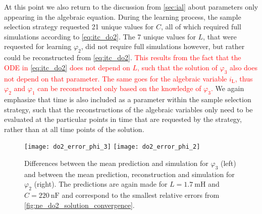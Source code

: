 \documentclass[AMA,STIX1COL]{WileyNJD-v2}
\newcommand{\mr}[1]{\mathrm{#1}}
\begin{document}
At this point we also return to the discussion from \autoref{sec:ial} about parameters only appearing in the algebraic equation. During the learning process, the sample selection strategy requested 21 unique values for $C$, all of which required full simulations according to \eqref{eq:itc_do2}. The 7 unique values for $L$, that were requested for learning $\varphi_2$, did not require full simulations however, but rather could be reconstructed from \eqref{eq:itc_do2}. \textcolor{red}{This results from the fact that the ODE in \eqref{eq:itc_do2} does not depend on $L$, such that the solution of $\varphi_3$ also does not depend on that parameter. The same goes for the algebraic variable $i_\mr{L}$, thus $\varphi_2$ and $\varphi_1$ can be reconstructed only based on the knowledge of $\varphi_3$.} We again emphasize that time is also included as a parameter within the sample selection strategy, such that the reconstructions of the algebraic variables only need to be evaluated at the particular points in time that are requested by the strategy, rather than at all time points of the solution.
\begin{figure}[t]
    \begin{center}
        \texttt{[image: do2\_error\_phi\_3]} \hspace{1.5cm} \texttt{[image: do2\_error\_phi\_2]}
    \end{center}
    \caption{Differences between the mean prediction and simulation for $\varphi_3$ (left) and between the mean prediction, reconstruction and simulation for $\varphi_2$ (right). The predictions are again made for $L = \SI{1.7}{\milli\henry}$ and $C = \SI{220}{\nano\farad}$ and correspond to the smallest relative errors from \autoref{fig:ne_do2_solution_convergence}.}
    \label{fig:ne_do2_error}
\end{figure}
\end{document}
